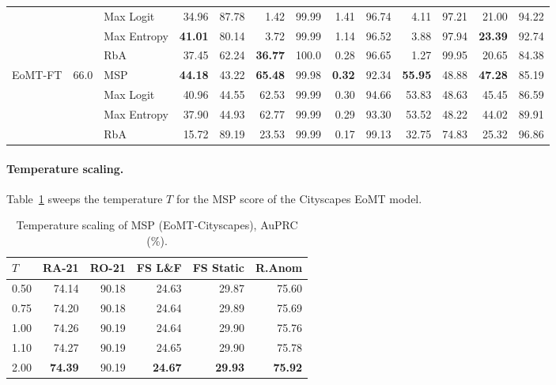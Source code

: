 \documentclass[10pt,twocolumn]{article}
\begin{document}
\begin{table}[t]
\begin{tabular}{l c l rr rr rr rr rr}
 & & Max Logit  & 34.96 & 87.78 & 1.42 & 99.99 & 1.41 & 96.74 & 4.11 & 97.21 & 21.00 & 94.22 \\
 & & Max Entropy& \textbf{41.01} & 80.14 & 3.72 & 99.99 & 1.14 & 96.52 & 3.88 & 97.94 & \textbf{23.39} & 92.74 \\
 & & RbA        & 37.45 & 62.24 & \textbf{36.77} & 100.0 & 0.28 & 96.65 & 1.27 & 99.95 & 20.65 & 84.38 \\
\midrule
\multirow{4}{*}{EoMT-FT} & \multirow{4}{*}{66.0}
 & MSP        & \textbf{44.18} & 43.22 & \textbf{65.48} & 99.98 & \textbf{0.32} & 92.34 & \textbf{55.95} & 48.88 & \textbf{47.28} & 85.19 \\
 & & Max Logit  & 40.96 & 44.55 & 62.53 & 99.99 & 0.30 & 94.66 & 53.83 & 48.63 & 45.45 & 86.59 \\
 & & Max Entropy& 37.90 & 44.93 & 62.77 & 99.99 & 0.29 & 93.30 & 53.52 & 48.22 & 44.02 & 89.91 \\
 & & RbA        & 15.72 & 89.19 & 23.53 & 99.99 & 0.17 & 99.13 & 32.75 & 74.83 & 25.32 & 96.86 \\
\bottomrule
\end{tabular}
\end{table}

\paragraph{Temperature scaling.}
Table~\ref{tab:temp} sweeps the temperature $T$ for the MSP score of the
Cityscapes EoMT model.

\begin{table}[t]
\centering
\caption{Temperature scaling of MSP (EoMT-Cityscapes), AuPRC (\%).}
\label{tab:temp}
\small
\setlength{\tabcolsep}{4pt}
\begin{tabular}{l r r r r r}
\toprule
$T$ & RA-21 & RO-21 & FS L\&F & FS Static & R.Anom \\
\midrule
0.50 & 74.14 & 90.18 & 24.63 & 29.87 & 75.60 \\
0.75 & 74.20 & 90.18 & 24.64 & 29.89 & 75.69 \\
1.00 & 74.26 & 90.19 & 24.64 & 29.90 & 75.76 \\
1.10 & 74.27 & 90.19 & 24.65 & 29.90 & 75.78 \\
2.00 & \textbf{74.39} & 90.19 & \textbf{24.67} & \textbf{29.93} & \textbf{75.92} \\
\bottomrule
\end{tabular}
\end{table}
\end{document}
